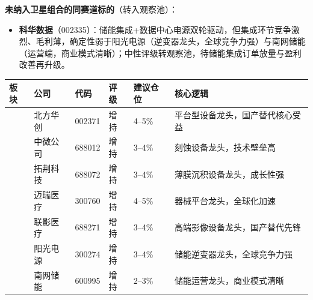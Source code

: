 \textbf{未纳入卫星组合的同赛道标的}（转入观察池）：
\vspace{0.2em}
\begin{itemize}[leftmargin=2em]
\item \textbf{科华数据}（002335）：储能集成+数据中心电源双轮驱动，但集成环节竞争激烈、毛利薄，确定性弱于阳光电源（逆变器龙头，全球竞争力强）与南网储能（运营端，商业模式清晰）；中性评级转观察池，待储能集成订单放量与盈利改善再升级。
\end{itemize}

\begin{exhibitbox}[表8-3：卫星组合推荐标的一览]
\centering
\small
\setlength{\tabcolsep}{3pt}
\setlength{\aboverulesep}{0pt}
\setlength{\belowrulesep}{0pt}
\begin{tabularx}{\linewidth}{L{2.8cm} L{1.7cm} C{1.4cm} C{1.2cm} C{1.5cm} X}
\toprule
\textbf{板块} & \textbf{公司} & \textbf{代码} & \textbf{评级} & \textbf{建议仓位} & \textbf{核心逻辑} \\
\midrule
{}
& 北方华创 & 002371 & 增持 & 4--5\% & 平台型设备龙头，国产替代核心受益 \\
& 中微公司 & 688012 & 增持 & 3--4\% & 刻蚀设备龙头，技术壁垒高 \\
 & 拓荆科技 & 688072 & 增持 & 3--4\% & 薄膜沉积设备龙头，成长性强 \\
\midrule
{}
& 迈瑞医疗 & 300760 & 增持 & 4--5\% & 器械平台龙头，全球化加速 \\
 & 联影医疗 & 688271 & 增持 & 3--4\% & 高端影像设备龙头，国产替代先锋 \\
\midrule
{}
& 阳光电源 & 300274 & 增持 & 3--4\% & 储能逆变器龙头，全球竞争力强 \\
 & 南网储能 & 600995 & 增持 & 2--3\% & 储能运营龙头，商业模式清晰 \\
\bottomrule
\end{tabularx}
\vspace{0.3em}
\end{exhibitbox}

